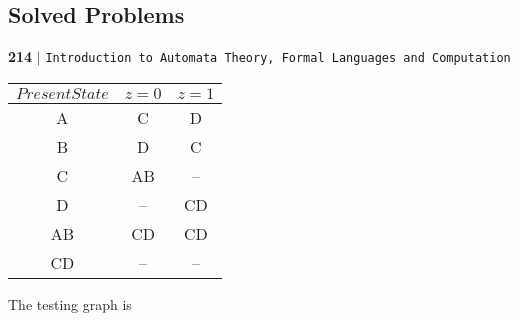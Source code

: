\documentclass[8pt]{beamer}
\begin{document}
\begin{frame}
\section*{Solved Problems}
\begin{flushleft}
    \textbf{214}\hspace*{0.1cm} \textbf{$|$} \hspace*{0.1cm} \texttt{Introduction to Automata Theory, Formal Languages and Computation}
  \end{flushleft}
  
  \vspace*{0.5cm}
    \begin{center}
\begin{tabular}{ccc}
 \hline

 \hline

 \hline

 \hline

 $Present State$ &  $z=0$ & $z=1$\\
\hline
A & C  &D \\
B & D  &C \\
C & AB & –\\
D & –  & CD \\
\hline 
AB& CD & CD \\
CD& –  &–\\
 \hline

 \hline

 \hline

 \hline
\end{tabular}
\end{center}
\hspace*{0.5cm} The testing graph is\\
\begin{center}
\end{center}
\end{frame}
\end{document}
